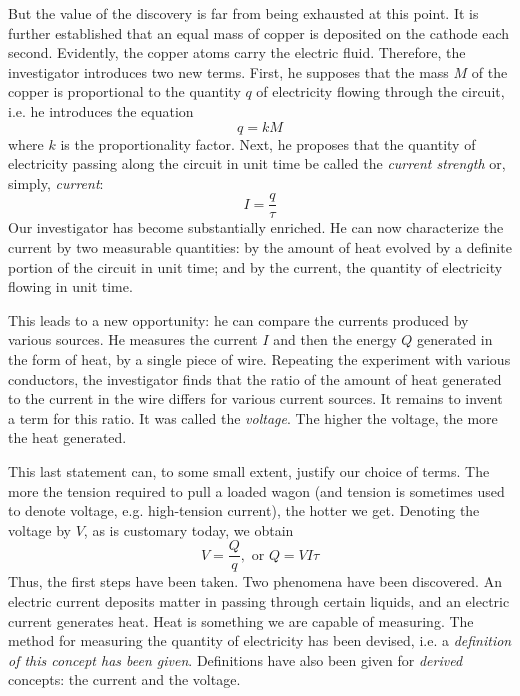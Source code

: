 But the value of the discovery is far from being exhausted at this point. It is further established that an equal mass of copper is deposited on the cathode each second. Evidently, the copper atoms carry the electric fluid. Therefore, the investigator introduces two new terms. First, he supposes that the mass $M$ of the copper is proportional to the quantity $q$ of electricity flowing through the circuit, i.e. he introduces the equation
\begin{equation*}%
q = kM
\end{equation*}
where $k$ is the proportionality factor. Next, he proposes that the quantity of electricity passing along the circuit in unit time be called the \emph{current strength} or, simply, \emph{current}:
\begin{equation*}%
I = \frac{q}{\tau}
\end{equation*}
Our investigator has become substantially enriched. He can now characterize the current by two measurable quantities: by the amount of heat evolved by a definite portion of the circuit in unit time; and by the current, the quantity of electricity flowing in unit time.

This leads to a new opportunity: he can compare the currents produced by various sources. He measures the current $I$ and then the energy $Q$ generated in the form of heat, by a single piece of wire. Repeating the experiment with various conductors, the investigator finds that the ratio of the amount of heat generated to the current in the wire differs for various current sources. It remains to invent a term for this ratio. It was called the \emph{voltage}. The higher the voltage, the more the heat generated.

This last statement can, to some small extent, justify our choice of terms. The more the tension required to pull a loaded wagon (and tension is sometimes used to denote voltage, e.g. high-tension current), the hotter we get. Denoting the voltage by $V$, as is customary today, we obtain
\begin{equation*}%
V = \frac{Q}{q}, \,\, \textrm{or} \,\, Q = V I \tau
\end{equation*}
Thus, the first steps have been taken. Two phenomena have been discovered. An electric current deposits matter in passing through certain liquids, and an electric current generates heat. Heat is something we are capable of measuring. The method for measuring the quantity of electricity has been devised, i.e. a \emph{definition of this concept has been given}. Definitions have also been given for \emph{derived} concepts: the current and the voltage.

